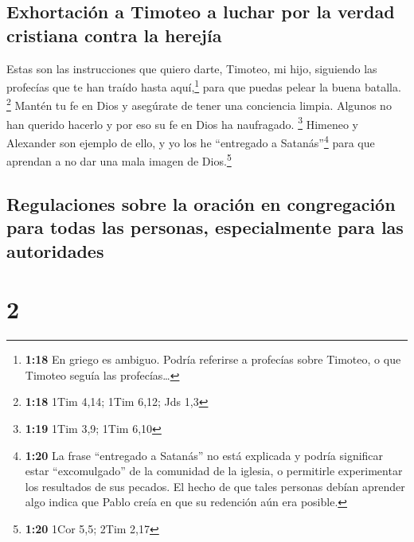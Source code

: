 \hypertarget{exhortaciuxf3n-a-timoteo-a-luchar-por-la-verdad-cristiana-contra-la-herejuxeda}{%
\subsection{Exhortación a Timoteo a luchar por la verdad cristiana
contra la
herejía}\label{exhortaciuxf3n-a-timoteo-a-luchar-por-la-verdad-cristiana-contra-la-herejuxeda}}

 Estas son las instrucciones que quiero darte, Timoteo,
mi hijo, siguiendo las profecías que te han traído hasta
aquí,\footnote{\textbf{1:18} En griego es ambiguo. Podría referirse a
  profecías sobre Timoteo, o que Timoteo seguía las profecías\ldots{}}
para que puedas pelear la buena batalla. \footnote{\textbf{1:18} 1Tim
  4,14; 1Tim 6,12; Jds 1,3}  Mantén tu fe en Dios y
asegúrate de tener una conciencia limpia. Algunos no han querido hacerlo
y por eso su fe en Dios ha naufragado. \footnote{\textbf{1:19} 1Tim 3,9;
  1Tim 6,10}  Himeneo y Alexander son ejemplo de ello, y
yo los he ``entregado a Satanás''\footnote{\textbf{1:20} La frase
  ``entregado a Satanás'' no está explicada y podría significar estar
  ``excomulgado'' de la comunidad de la iglesia, o permitirle
  experimentar los resultados de sus pecados. El hecho de que tales
  personas debían aprender algo indica que Pablo creía en que su
  redención aún era posible.} para que aprendan a no dar una mala imagen
de Dios.\footnote{\textbf{1:20} 1Cor 5,5; 2Tim 2,17}

\hypertarget{regulaciones-sobre-la-oraciuxf3n-en-congregaciuxf3n-para-todas-las-personas-especialmente-para-las-autoridades}{%
\subsection{Regulaciones sobre la oración en congregación para todas las
personas, especialmente para las
autoridades}\label{regulaciones-sobre-la-oraciuxf3n-en-congregaciuxf3n-para-todas-las-personas-especialmente-para-las-autoridades}}

\hypertarget{section-1}{%
\section{2}\label{section-1}}


